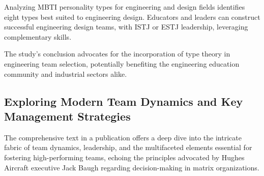 \documentclass[runningheads]{llncs}
\begin{document}
Analyzing MBTI personality types for engineering and design fields identifies eight types best suited to engineering design. Educators and leaders can construct successful engineering design teams, with ISTJ or ESTJ leadership, leveraging complementary skills.

The study's conclusion advocates for the incorporation of type theory in engineering team selection, potentially benefiting the engineering education community and industrial sectors alike.

\subsection{Exploring Modern Team Dynamics and Key Management Strategies}
The comprehensive text in a publication \cite{ref_3} offers a deep dive into the intricate fabric of team dynamics, leadership, and the multifaceted elements essential for fostering high-performing teams, echoing the principles advocated by Hughes Aircraft executive Jack Baugh regarding decision-making in matrix organizations.
\end{document}
